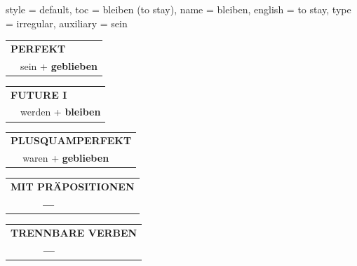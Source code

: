 \begin{verbentry}{
  style = {default},
  toc = {bleiben (to stay)},
  name = {bleiben},
  english = {to stay},
  type = {irregular},
  auxiliary = {sein}
}
    \vspace{10pt}

 \begin{tabular}{rl}
     \multicolumn{2}{l}{\textbf{PERFEKT}}\\
  &  sein + \textbf{geblieben}\\
  \end{tabular}
\hfill
   \begin{tabular}{rl}
   
    \multicolumn{2}{l}{\textbf{FUTURE I} }\\
  &  werden + \textbf{bleiben}\\
 
  \end{tabular}
\hfill
   \begin{tabular}{rl}
      \multicolumn{2}{l}{\textbf{PLUSQUAMPERFEKT}}\\
  &  waren + \textbf{geblieben}\\
  \end{tabular}
  
  \vspace{10pt}

\begin{tabular}{lll}
\multicolumn{3}{l}{\textbf{MIT PRÄPOSITIONEN}}\\
& \textbf{---} & \\
\end{tabular}
\hfill
\begin{tabular}{lll}
\multicolumn{3}{l}{\textbf{TRENNBARE VERBEN}}\\
& \textbf{---} & \\
\end{tabular}

  \vspace{-5pt}
\end{verbentry}

